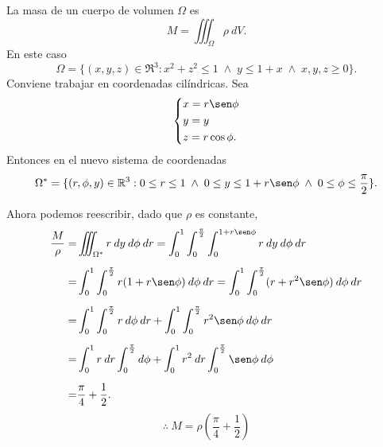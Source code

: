 \begin{solution}
    La masa de un cuerpo de volumen $\Omega$ es 
    \[
    M=\iiint_\Omega \rho\:dV.
    \]
    En este caso
    \[
    \Omega=\{(x,y,z)\in\Re^3:x^2+z^2\leq1\;\land\;y\leq1+x\; \land\;x,y,z\geq0\}.
    \]
    Conviene trabajar en coordenadas cil\'indricas. Sea
    \[\begin{dcases}
        x=r\sen\phi\\
        y=y\\
        z=r\cos\phi.
    \end{dcases}\]
    Entonces en el nuevo sistema de coordenadas
    \[
        \Omega^*=\{(r,\phi,y)\in\Re^3:    0\leq  r\leq1\; \land\; 0 \leq y\leq1+r\sen\phi\;\land\;  0\leq\phi\leq\frac{\pi}{2}\}.
    \]
   
    Ahora podemos reescribir, dado que $\rho$ es constante,
    \begin{align*}
  \frac{M}{\rho} =& \iiint_{\Omega^*} r\:dy\:d\phi\:dr=\int_0^1 \int_0^{\frac{\pi}{2}} \int_0^{1+r\sen\phi} r\:dy\:d\phi\:dr\\[.2cm]
    =&\int_0^1 \int_0^{\frac{\pi}{2}}r(1+r\sen\phi)\:d\phi\:dr=\int_0^1 \int_0^{\frac{\pi}{2}} ( r+r^2\sen\phi) \:d\phi\:dr\\[.2cm]
    =&\int_0^1\int_0^{\frac{\pi}{2}} r\:d\phi\:dr+\int_0^1\int_0^{\frac{\pi}{2}}r^2\sen\phi\:d\phi\:dr\\[.2cm]
    =&\int_0^1r\:dr\int_0^{\frac{\pi}{2}}d\phi+\int_0^1r^2\:dr\int_0^{\frac{\pi}{2}}\sen\phi\:d\phi\\[.2cm]
    =&\frac{\pi}{4}+\frac{1}{2}.
    \end{align*}
    \[
    \therefore\:M=\rho\left(\frac{\pi}{4}+\frac{1}{2}\right)
    \]
\end{solution}


